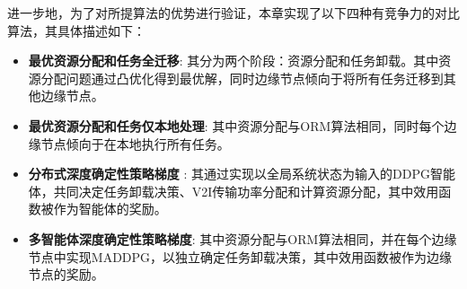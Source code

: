 \begin{table}[h]\small
{} %
\centering
{}
\label{table 3-2}
\end{table}
 
进一步地，为了对所提算法的优势进行验证，本章实现了以下四种有竞争力的对比算法，其具体描述如下：
\begin{itemize}
	\item \textbf{最优资源分配和任务全迁移}: 其分为两个阶段：资源分配和任务卸载。其中资源分配问题通过凸优化得到最优解，同时边缘节点倾向于将所有任务迁移到其他边缘节点。
	\item \textbf{最优资源分配和任务仅本地处理}: 其中资源分配与ORM算法相同，同时每个边缘节点倾向于在本地执行所有任务。
	\item \textbf{分布式深度确定性策略梯度} \cite{barth2018distributed}: 其通过实现以全局系统状态为输入的DDPG智能体，共同决定任务卸载决策、V2I传输功率分配和计算资源分配，其中效用函数被作为智能体的奖励。
	\item \textbf{多智能体深度确定性策略梯度}\cite{zhang2021adaptive}: 其中资源分配与ORM算法相同，并在每个边缘节点中实现MADDPG，以独立确定任务卸载决策，其中效用函数被作为边缘节点的奖励。
\end{itemize}

